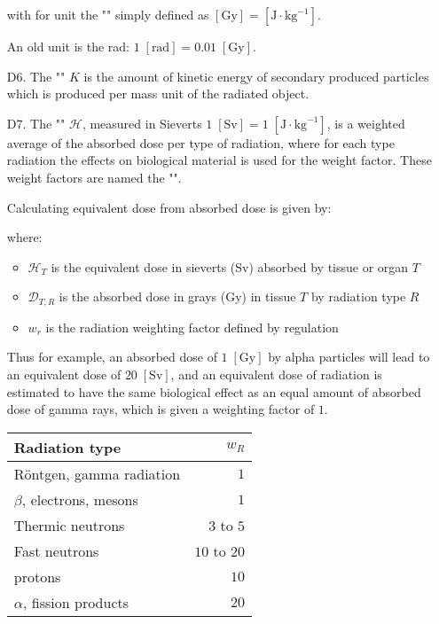 \begin{enumerate}
		with for unit the "" simply defined as $[\text{Gy}]=[\text{J}\cdot\text{kg}^{-1}]$. 
		\begin{tcolorbox}[title=Remark,colframe=black,arc=10pt]
		An old unit is the rad: $1\;[\text{rad}]=0.01\;[\text{Gy}]$.
		\end{tcolorbox}	
		
		\item[D6.] The "" $K$ is the amount of kinetic energy of secondary produced 	particles which is produced per mass unit of the radiated object.
		
		\item[D7.] The "" $\mathcal{H}$, measured in Sieverts $1\;[\text{Sv}]=1\;[\text{J}\cdot\text{kg}^{-1}]$, is a weighted average of the absorbed dose per type of radiation, where for each type radiation the effects on biological material is used for the weight factor. These weight factors are named the "". 
	
		Calculating equivalent dose from absorbed dose is given by:
		
		where:
		\begin{itemize}
			\item $\mathcal{H}_T$ is the equivalent dose in sieverts (Sv) absorbed by tissue or organ $T$
			
			\item $\mathcal{D}_{T,R}$ is the absorbed dose in grays (Gy) in tissue $T$ by radiation type $R$
			
			\item $w_r$ is the radiation weighting factor defined by regulation
		\end{itemize}
		Thus for example, an absorbed dose of $1\;[\text{Gy}]$ by alpha particles will lead to an equivalent dose of $20\;[\text{Sv}]$, and an equivalent dose of radiation is estimated to have the same biological effect as an equal amount of absorbed dose of gamma rays, which is given a weighting factor of $1$.
		
		\begin{center}
			\begin{tabular}{||l|r||}
			\hline
			{\bf Radiation type}&\boldmath$w_R$\unboldmath\\
			\hline
			\hline
			R\"ontgen, gamma radiation& $1$\\
			$\beta$, electrons, mesons& $1$\\
			Thermic neutrons& $3$ to $5$\\
			Fast neutrons & $10$ to $20$\\
			protons & $10$\\
			$\alpha$, fission products & $20$\\
			\hline
			\end{tabular}
		\end{center}
		

\end{enumerate}
